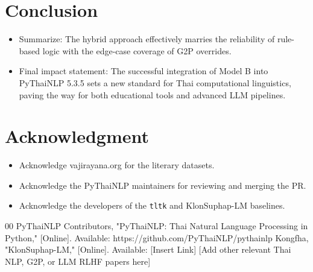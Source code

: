 \documentclass[conference]{IEEEtran}
\begin{document}
\section{Conclusion}
\begin{itemize}
    \item Summarize: The hybrid approach effectively marries the reliability of rule-based logic with the edge-case coverage of G2P overrides.
    \item Final impact statement: The successful integration of Model B into PyThaiNLP 5.3.5 sets a new standard for Thai computational linguistics, paving the way for both educational tools and advanced LLM pipelines.
\end{itemize}

\section*{Acknowledgment}
\begin{itemize}
    \item Acknowledge vajirayana.org for the literary datasets.
    \item Acknowledge the PyThaiNLP maintainers for reviewing and merging the PR.
    \item Acknowledge the developers of the \texttt{tltk} and KlonSuphap-LM baselines.
\end{itemize}

\begin{thebibliography}{00}
 PyThaiNLP Contributors, "PyThaiNLP: Thai Natural Language Processing in Python," [Online]. Available: https://github.com/PyThaiNLP/pythainlp
 Kongfha, "KlonSuphap-LM," [Online]. Available: [Insert Link]
 [Add other relevant Thai NLP, G2P, or LLM RLHF papers here]
\end{thebibliography}
\end{document}
